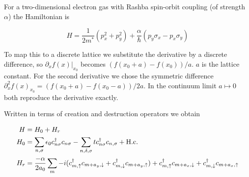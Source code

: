 \documentclass[11pt,twoside]{book}
\newcommand{\inp}[1]{\ensuremath{\left(#1\right)}}
\newcommand{\dell}{\partial}
\begin{document}
%
%

For a two-dimensional electron gas with Rashba spin-orbit coupling (of
strength $\alpha$) the Hamiltonian is

\begin{equation}
    H = \frac{1}{2 m^*} (p_x^2 + p_y^2) +
    \frac{\alpha}{\hbar} \inp{p_y\sigma_x - p_x\sigma_y}
\end{equation}

To map this to a discrete lattice we substitute the derivative by a discrete
difference, so $\dell_x f(x)|_{x_0}$ becomes $(f(x_0+a) - f(x_0))/a$. $a$ is
the lattice constant. For the
second derivative we chose the symmetric difference $\dell_x^2 f(x)_{x_0} =
(f(x_0+a) - f(x_0-a))/2a$. In the continuum limit $a \mapsto 0$ both reproduce
the derivative exactly.

Written in terms of creation and destruction operators we obtain

\begin{align}
    H   &= H_0 + H_r\\
    H_0 &= \sum_{n,\sigma} \epsilon_0 c^{\dagger}_{n\sigma} c_{n\sigma}
           - \sum_{n,\delta,\sigma} t c^\dagger_{n\sigma} c_{n,\sigma} +
           \textnormal{H.c.}\\
    H_r &= \frac{-\alpha}{2 a_0} \sum_m
        -i( c^\dagger_{m,\uparrow} c_{m+a_y,\downarrow}
            + c^\dagger_{m,\downarrow} c_{m+a_y,\uparrow})
         + c^\dagger_{m,\uparrow} c_{m+a_x,\downarrow}
            + c^\dagger_{m,\downarrow} c_{m+a_x,\uparrow}
\end{align}
\end{document}
